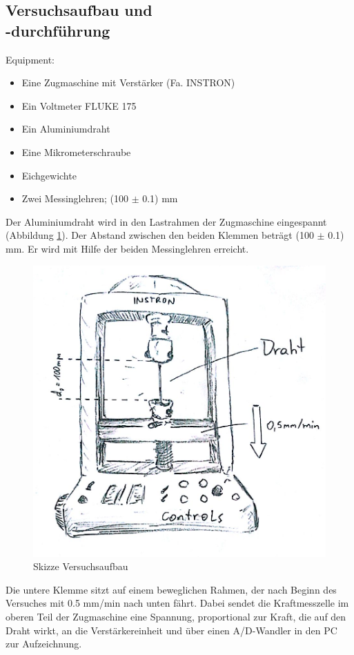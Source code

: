 \documentclass[12pt,a4paper]{article}
\begin{document}
\begin{multicols}{2}
\subsection{Versuchsaufbau und \\-durchführung}
Equipment:\\
\begin{itemize}
	\item Eine Zugmaschine mit Verstärker (Fa. INSTRON)
	\item Ein Voltmeter FLUKE 175
	\item Ein Aluminiumdraht
	\item Eine Mikrometerschraube
	\item Eichgewichte
	\item Zwei Messinglehren; (100 $\pm$ 0.1) mm
\end{itemize}
Der Aluminiumdraht wird in den Lastrahmen der Zugmaschine eingespannt (Abbildung \ref{fig:elastizitaet}). Der Abstand zwischen den beiden Klemmen beträgt (100 $\pm$ 0.1) mm. Er wird mit Hilfe der beiden Messinglehren erreicht.\\
\begin{figure}[H]
	\centering
	\includegraphics[scale=0.23]{./figure/zugversuch_aufbau.png}
	\caption{Skizze Versuchsaufbau}
	\label{fig:elastizitaet}
\end{figure}
\noindent
Die untere Klemme sitzt auf einem beweglichen Rahmen, der nach Beginn des Versuches mit 0.5 mm/min nach unten fährt. Dabei sendet die Kraftmesszelle im oberen Teil der Zugmaschine eine Spannung, proportional zur Kraft, die auf den Draht wirkt, an die Verstärkereinheit und über einen A/D-Wandler in den PC zur Aufzeichnung.\\

\end{multicols}
\end{document}
